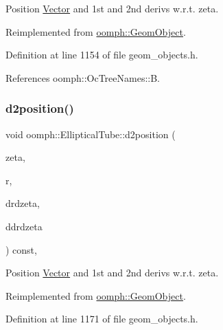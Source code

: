Position \hyperlink{classoomph_1_1Vector}{Vector} and 1st and 2nd derivs w.\+r.\+t. zeta. 



Reimplemented from \hyperlink{classoomph_1_1GeomObject_a08472dbe196123490ea109762cefd00c}{oomph\+::\+Geom\+Object}.



Definition at line 1154 of file geom\+\_\+objects.\+h.



References oomph\+::\+Oc\+Tree\+Names\+::B.

\mbox{\label{classoomph_1_1EllipticalTube_a2fe694a504750371d3ef98a20b92e6a5}} 
\subsubsection{\texorpdfstring{d2position()}{d2position()}\hspace{0.1cm}{\footnotesize\ttfamily [2/2]}}
{\footnotesize\ttfamily void oomph\+::\+Elliptical\+Tube\+::d2position (\begin{DoxyParamCaption}\item[{const \hyperlink{classoomph_1_1Vector}{Vector}$<$ double $>$ \&}]{zeta,  }\item[{\hyperlink{classoomph_1_1Vector}{Vector}$<$ double $>$ \&}]{r,  }\item[{\hyperlink{classoomph_1_1DenseMatrix}{Dense\+Matrix}$<$ double $>$ \&}]{drdzeta,  }\item[{\hyperlink{classoomph_1_1RankThreeTensor}{Rank\+Three\+Tensor}$<$ double $>$ \&}]{ddrdzeta }\end{DoxyParamCaption}) const\hspace{0.3cm}{\ttfamily [inline]}, {\ttfamily [virtual]}}



Position \hyperlink{classoomph_1_1Vector}{Vector} and 1st and 2nd derivs w.\+r.\+t. zeta. 



Reimplemented from \hyperlink{classoomph_1_1GeomObject_a4fdbd372e26d4486026c06dcfdaafe81}{oomph\+::\+Geom\+Object}.



Definition at line 1171 of file geom\+\_\+objects.\+h.



